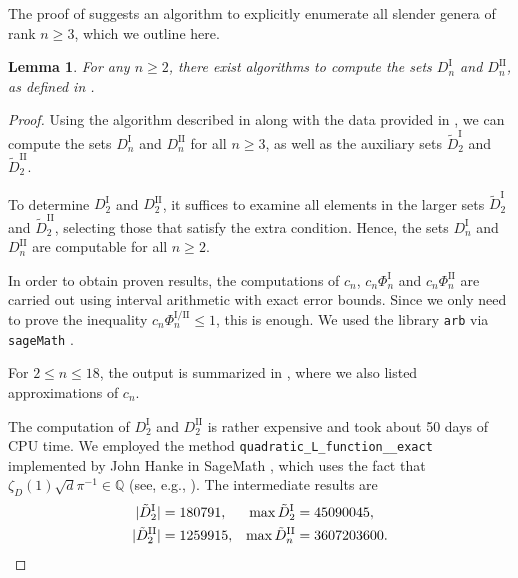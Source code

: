 \documentclass[a4paper]{amsart}
\theoremstyle{definition}
\theoremstyle{plain}
\newtheorem{lemma}[definition]{Lemma}
\newcommand{\QQ}{\mathbb{Q}}
\newcommand{\I}{\mathrm{I}}
\newcommand{\II}{\mathrm{II}}
\begin{document}
The proof of  suggests an algorithm to explicitly enumerate all slender genera of rank \(n \geq 3\), which we outline here.

\begin{lemma} \label{lem:possible_det}
    For any \(n \geq 2\), there exist algorithms to compute the sets \(D_n^{\I}\) and \(D_n^{\II}\), as defined in .
\end{lemma}

\begin{proof}
    Using the algorithm described in  along with the data provided in , we can compute the sets \(D_n^{\I}\) and \(D_n^{\II}\) for all \(n \geq 3\), as well as the auxiliary sets \(\tilde{D}_2^{\I}\) and \(\tilde{D}_2^{\II}\). 

    To determine \(D_2^{\I}\) and \(D_2^{\II}\), it suffices to examine all elements in the larger sets \(\tilde{D}_2^{\I}\) and \(\tilde{D}_2^{\II}\), selecting those that satisfy the extra condition. Hence, the sets \(D_n^{\I}\) and \(D_n^{\II}\) are computable for all \(n \geq 2\).
    
    In order to obtain proven results, the computations of \(c_n\), \(c_n\Phi^\I_n\) and \(c_n\Phi^\II_n\) are carried out using interval arithmetic with exact error bounds. Since we only need to prove the inequality $c_n\Phi^{\I / \II}_n\leq 1$, this is enough.  
    We used the library \verb+arb+  \cite{Johansson2017arb} via \texttt{sageMath} \cite{sage}.
    
    For \(2 \leq n \leq 18\), the output is summarized in , where we also listed approximations of \(c_n\). 
    
    The computation of $D_2^\I$ and $D_2^\II$ is rather expensive and took about 50 days of CPU time. We employed the method \verb+quadratic_L_function__exact+ implemented by John Hanke \cite{hanke} in SageMath \cite{sage}, which uses the fact that 
    \(\zeta_D(1)\sqrt{d}\pi^{-1} \in \QQ\) (see, e.g., \cite[Chapter 12, Theorem 10.1]{hua}).
    The intermediate results are
    \begin{align*}
        |\tilde D_2^\I| & = 180791, & \max \tilde D_2^\I &= 45090045,  \\
        |\tilde D_2^\II| & = 1259915, & \max \tilde D_n^\II& =3607203600. \qedhere
    \end{align*}
\end{proof}
\end{document}

